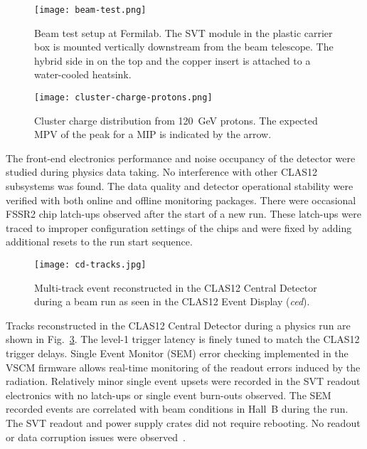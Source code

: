 \begin{figure}[hbt] 
\centering 
\texttt{[image: beam-test.png]}
\caption{Beam test setup at Fermilab. The SVT module in the plastic carrier box is mounted vertically downstream
  from the beam telescope. The hybrid side in on the top and the copper insert is attached to a water-cooled heatsink.}
\label{fig:beam-test}
\end{figure}

\begin{figure}[h] 
\centering 
\texttt{[image: cluster-charge-protons.png]}
\caption{Cluster charge distribution from 120~GeV protons. The expected MPV of the peak for a MIP is indicated
  by the arrow.}
\label{fig:cluster-charge-protons}
\end{figure}

The front-end electronics performance and noise occupancy of the detector were studied during physics data
taking. No interference with other CLAS12 subsystems was found. The data quality and detector operational
stability  were verified with both online and offline monitoring packages. There were occasional FSSR2 chip
latch-ups observed after the start of a new run. These latch-ups were traced to improper configuration settings
of the chips and were fixed by adding additional resets to the run start sequence.

\begin{figure}[h] 
\centering 
\texttt{[image: cd-tracks.jpg]}
\caption{Multi-track event reconstructed in the CLAS12 Central Detector during a beam run as seen in the CLAS12
  Event Display ({\it ced}).}
\label{fig:cd-tracks}
\end{figure}

Tracks reconstructed in the CLAS12 Central Detector during a physics run are shown in Fig.~\ref{fig:cd-tracks}.
The level-1 trigger latency is finely tuned to match the CLAS12 trigger delays. Single Event Monitor (SEM) error
checking implemented in the VSCM firmware allows real-time monitoring of the readout errors induced by the
radiation. Relatively minor single event upsets were recorded in the SVT readout electronics with no latch-ups or
single event burn-outs observed. The SEM recorded events are correlated with beam conditions in Hall~B during
the run. The SVT readout and power supply crates did not require rebooting. No readout or data corruption issues
were observed~\cite{SEENOTE}. 


